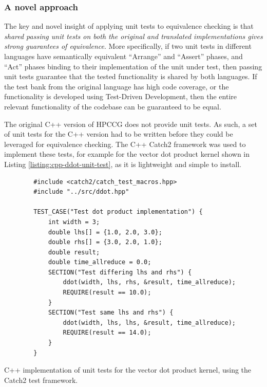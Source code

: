 \subsubsection{A novel approach}
\label{sssec:equivalence-polyglotest}

The key and novel insight of applying unit tests to equivalence checking is that \textit{shared passing unit tests on both the original and translated implementations gives strong guarantees of equivalence}. More specifically, if two unit tests in different languages have semantically equivalent ``Arrange'' and ``Assert'' phases, and ``Act'' phases binding to their implementation of the unit under test, then passing unit tests guarantee that the tested functionality is shared by both languages. If the test bank from the original language has high code coverage, or the functionality is developed using Test-Driven Development, then the entire relevant functionality of the codebase can be guaranteed to be equal.


The original C++ version of \acrshort{HPCCG} does not provide unit tests. As such, a set of unit tests for the C++ version had to be written before they could be leveraged for equivalence checking. The C++ Catch2 \cite{CatchorgCatch22024} framework was used to implement these tests, for example for the vector dot product kernel shown in Listing \ref{listing:cpp-ddot-unit-test}, as it is lightweight and simple to install.

\begin{code}
    \begin{verbatim}
        #include <catch2/catch_test_macros.hpp>
        #include "../src/ddot.hpp"
        
        TEST_CASE("Test dot product implementation") {
            int width = 3;
            double lhs[] = {1.0, 2.0, 3.0};
            double rhs[] = {3.0, 2.0, 1.0};
            double result;
            double time_allreduce = 0.0;
            SECTION("Test differing lhs and rhs") {
                ddot(width, lhs, rhs, &result, time_allreduce);
                REQUIRE(result == 10.0);
            }
            SECTION("Test same lhs and rhs") {
                ddot(width, lhs, lhs, &result, time_allreduce);
                REQUIRE(result == 14.0);
            }
        }
    \end{verbatim}
    \caption{C++ implementation of unit tests for the vector dot product kernel, using the Catch2 test framework.}
    \label{listing:cpp-ddot-unit-test}
\end{code}

